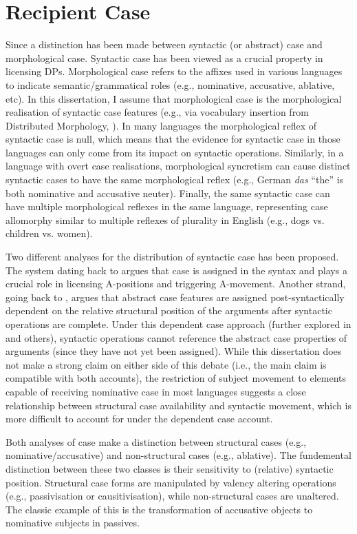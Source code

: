 \section{Recipient Case}
Since \cite{Vergnaud.1977} a distinction has been made between syntactic (or abstract) case and morphological case. Syntactic case has been viewed as a crucial property in licensing DPs. Morphological case refers to the affixes used in various languages to indicate semantic/grammatical roles (e.g., nominative, accusative, ablative, etc). In this dissertation, I assume that morphological case is the morphological realisation of syntactic case features (e.g., via vocabulary insertion from Distributed Morphology, \citealt{Halle.1993}). In many languages the morphological reflex of syntactic case is null, which means that the evidence for syntactic case in those languages can only come from its impact on syntactic operations. Similarly, in a language with overt case realisations, morphological syncretism can cause distinct syntactic cases to have the same morphological reflex (e.g., German \textit{das} ``the'' is both nominative and accusative neuter). Finally, the same syntactic case can have multiple morphological reflexes in the same language, representing case allomorphy similar to multiple reflexes of plurality in English (e.g., dogs vs. children vs. women).

Two different analyses for the distribution of syntactic case has been proposed. The system dating back to \cite{Vergnaud.1977} argues that case is assigned in the syntax and plays a crucial role in licensing A-positions and triggering A-movement. Another strand, going back to \cite{Yip.1987}, argues that abstract case features are assigned post-syntactically dependent on the relative structural position of the arguments after syntactic operations are complete. Under this dependent case approach (further explored in \citealt{Marantz.1991,McFadden.2004} and others), syntactic operations cannot reference the abstract case properties of arguments (since they have not yet been assigned). While this dissertation does not make a strong claim on either side of this debate (i.e., the main claim is compatible with both accounts), the restriction of subject movement to elements capable of receiving nominative case in most languages suggests a close relationship between structural case availability and syntactic movement, which is more difficult to account for under the dependent case account.

Both analyses of case make a distinction between structural cases (e.g., nominative/accusative) and non-structural cases (e.g., ablative). The fundemental distinction between these two classes is their sensitivity to (relative) syntactic position. Structural case forms are manipulated by valency altering operations (e.g., passivisation or causitivisation), while non-structural cases are unaltered. The classic example of this is the transformation of accusative objects to nominative subjects in passives.

